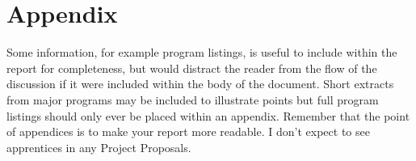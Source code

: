 \chapter{Appendix}

Some information, for example program listings, is useful to include within the report
for completeness, but would distract the reader from the flow of the discussion if it were included
within the body of the document. Short extracts from major programs may be included to illustrate
points but full program listings should only ever be placed within an appendix. Remember that the
point of appendices is to make your report more readable. I don’t expect to see apprentices in any
Project Proposals.
